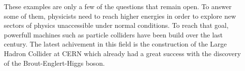     These examples are only a few of the questions that remain open. To answer some of them, physicists need to reach higher energies in order to explore new sectors of physics unaccessible under normal conditions. To reach that goal, powerfull machines such as particle colliders have been build over the last century. The latest achivement in this field is the construction of the Large Hadron Collider at CERN which already had a great success with the discovery of the Brout-Englert-Higgs boson.
